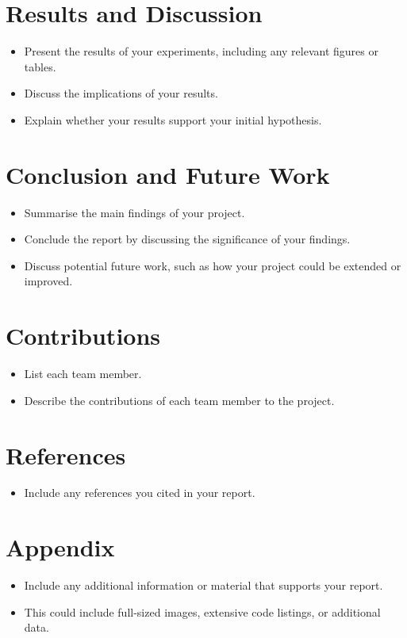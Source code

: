 \documentclass{article}
\begin{document}
\section{Results and Discussion}
\begin{itemize}
    \item Present the results of your experiments, including any relevant
          figures
          or tables.
    \item Discuss the implications of your results.
    \item Explain whether your results support your initial hypothesis.
\end{itemize}

\section{Conclusion and Future Work}
\begin{itemize}
    \item Summarise the main findings of your project.
    \item Conclude the report by discussing the significance of your findings.
    \item Discuss potential future work, such as how your project could be
          extended
          or improved.
\end{itemize}

\section{Contributions}
\begin{itemize}
    \item List each team member.
    \item Describe the contributions of each team member to the project.
\end{itemize}

\section{References}
\begin{itemize}
    \item Include any references you cited in your report.
\end{itemize}

\section{Appendix}
\begin{itemize}
    \item Include any additional information or material that supports your
          report.
    \item This could include full-sized images, extensive code listings, or
          additional data.
\end{itemize}
\end{document}
